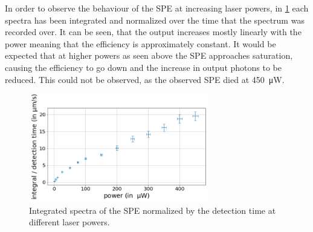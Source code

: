In order to observe the behaviour of the SPE at increasing laser powers, in \cref{fig_spe_integrals} each spectra has been integrated and normalized over the time that the spectrum was recorded over. %
It can be seen, that the output increases mostly linearly with the power meaning that the efficiency is approximately constant.
It would be expected that at higher powers as seen above the SPE approaches saturation, causing the efficiency to go down and the increase in output photons to be reduced.
This could not be observed, as the observed SPE died at \SI{450}{\micro W}.

\begin{figure}[!ht]
    \centering
    \includegraphics[width=0.7\textwidth]{img/output_t2/integrals.png}
    \caption{Integrated spectra of the SPE normalized by the detection time at different laser powers.}
    \label{fig_spe_integrals}
\end{figure}
